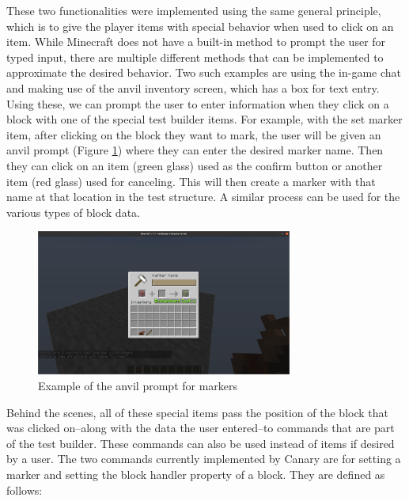 \documentclass[12pt]{article}
\begin{document}
\begin{onehalfspacing}
These two functionalities were implemented using the same general
principle, which is to give the player items with special behavior when
used to click on an item. While Minecraft does not have a built-in
method to prompt the user for typed input, there are multiple different
methods that can be implemented to approximate the desired behavior. Two
such examples are using the in-game chat and making use of the anvil
inventory screen, which has a box for text entry. Using these, we can
prompt the user to enter information when they click on a block with one
of the special test builder items. For example, with the set marker
item, after clicking on the block they want to mark, the user will be
given an anvil prompt (Figure \ref{fig:4_1_4}) where they can enter the desired
marker name. Then they can click on an item (green glass) used as the
confirm button or another item (red glass) used for canceling. This will
then create a marker with that name at that location in the test
structure. A similar process can be used for the various types of block
data.

\begin{figure}[h] 
    \centering
    \includegraphics[width=0.75\textwidth]{media/media/image8.png} 
    \caption{Example of the anvil prompt for markers} 
    \label{fig:4_1_4}  
\end{figure}


Behind the scenes, all of these special items pass the position of the
block that was clicked on--along with the data the user entered--to
commands that are part of the test builder. These commands can also be
used instead of items if desired by a user. The two commands currently
implemented by Canary are for setting a marker and setting the block
handler property of a block. They are defined as follows:


\end{onehalfspacing}
\end{document}
